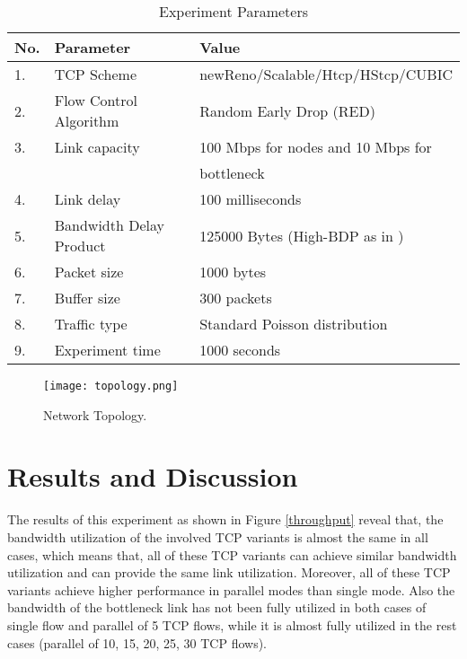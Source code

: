 \documentclass[a4paper, conference]{IEEEtran}
\begin{document}
\begin{table}[h]
	\caption{Experiment Parameters}
	\begin{center}
	\begin{tabular}{p{0.2cm}p{3cm}p{4.2cm}} \hline
	No.& Parameter				 &	Value										\\ \hline
	1. & TCP Scheme			 	 &	newReno/Scalable/Htcp/HStcp/CUBIC			\\ 2. & Flow Control Algorithm  &	Random Early Drop (RED)						\\ 3. & Link capacity			 &	100 Mbps for nodes and 10 Mbps for			\\ & 						 &	bottleneck									\\ 4. & Link delay			 	 &	100 milliseconds							\\ 5. & Bandwidth Delay Product &	125000 Bytes (High-BDP as in \cite{RFC1072})\\ 6. & Packet size			 &	1000 bytes									\\ 7. & Buffer size			 &	300 packets									\\ 8. & Traffic type			 &	Standard Poisson distribution				\\ 9. & Experiment time		 &	1000 seconds								\\ \hline
	\end{tabular}
	\label{params}
	\end{center}
\end{table}

\begin{figure}[h]
\centerline{\texttt{[image: topology.png]}} 
\caption{Network Topology.}
\label{topo}
\end{figure}

\section{Results and Discussion}

The results of this experiment as shown in Figure \ref{throughput} reveal that, the bandwidth utilization of the involved TCP variants is almost the same in all cases, which means that, all of these TCP variants can achieve similar bandwidth utilization and can provide the same link utilization. Moreover, all of these TCP variants achieve higher performance in parallel modes than single mode. Also the bandwidth of the bottleneck link has not been fully utilized in both cases of single flow and parallel of 5 TCP flows, while it is almost fully utilized in the rest cases (parallel of 10, 15, 20, 25, 30 TCP flows).
\end{document}

